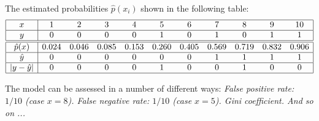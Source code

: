 The estimated probabilities $\hat{p}(x_i)$ shown in the following table:
\[
\begin{array}{|c|cccccccccc|}\hline
x			& 1 & 2 & 3 & 4 & 5 & 6 & 7 & 8 & 9 & 10 \\ \hline
y			& 0 & 0 & 0 & 0 & 1 & 0 & 1 & 0 & 1 & 1 \\  \hline\hline
\hat{p}(x)	& 0.024 & 0.046 & 0.085 & 0.153 & 0.260 & 0.405 & 0.569 & 0.719 & 0.832 & 0.906 \\ \hline
\hat{y}		& 0 & 0 & 0 & 0 & 0 & 0 & 1 & 1 & 1 & 1 \\  \hline
|y-\hat{y}|	& 0 & 0 & 0 & 0 & 1 & 0 & 0 & 1 & 0 & 0 \\  \hline
\end{array}
\]	

The model can be assessed in a number of different ways:
\bit
\it False positive rate: $1/10$ (case $x=8$).
\it False negative rate: $1/10$ (case $x=5$).
\it Gini coefficient.
\it And so on ...
\eit

%
%

%

\stopcontents[chapters]
\endinput
